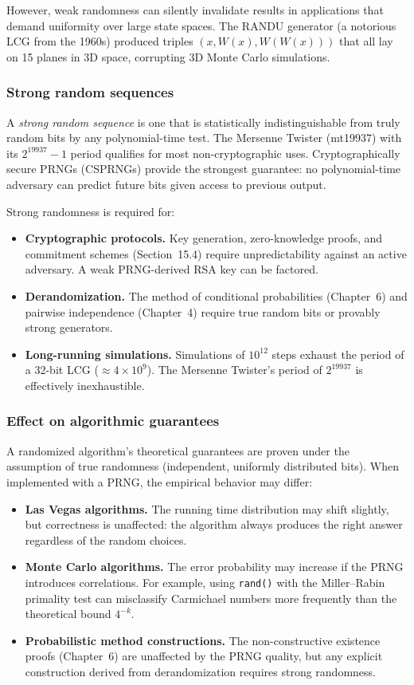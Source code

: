 \documentclass[twoside,12pt]{book}
\theoremstyle{plain}
\theoremstyle{definition}
\theoremstyle{remark}
\begin{document}
However, weak randomness can silently invalidate results in applications
that demand uniformity over large state spaces. The RANDU generator (a
notorious LCG from the 1960s) produced triples $(x, W(x), W(W(x)))$ that
all lay on 15 planes in 3D space, corrupting 3D Monte Carlo simulations.

\subsubsection{Strong random sequences}

A \emph{strong random sequence} is one that is statistically
indistinguishable from truly random bits by any polynomial-time test.
The Mersenne Twister (mt19937) with its $2^{19937}-1$ period qualifies for
most non-cryptographic uses. Cryptographically secure PRNGs (CSPRNGs)
provide the strongest guarantee: no polynomial-time adversary can predict
future bits given access to previous output.

Strong randomness is required for:
\begin{itemize}
\item \textbf{Cryptographic protocols.} Key generation, zero-knowledge
proofs, and commitment schemes (Section~15.4) require unpredictability
against an active adversary. A weak PRNG-derived RSA key can be factored.
\item \textbf{Derandomization.} The method of conditional probabilities
(Chapter~6) and pairwise independence (Chapter~4) require true random
bits or provably strong generators.
\item \textbf{Long-running simulations.} Simulations of $10^{12}$ steps
exhaust the period of a 32-bit LCG ($\approx 4\times 10^9$). The
Mersenne Twister's period of $2^{19937}$ is effectively inexhaustible.
\end{itemize}

\subsubsection{Effect on algorithmic guarantees}

A randomized algorithm's theoretical guarantees are proven under the
assumption of true randomness (independent, uniformly distributed bits).
When implemented with a PRNG, the empirical behavior may differ:

\begin{itemize}
\item \textbf{Las Vegas algorithms.} The running time distribution may
shift slightly, but correctness is unaffected: the algorithm always
produces the right answer regardless of the random choices.
\item \textbf{Monte Carlo algorithms.} The error probability may increase
if the PRNG introduces correlations. For example, using \texttt{rand()}
with the Miller--Rabin primality test can misclassify Carmichael numbers
more frequently than the theoretical bound $4^{-k}$.
\item \textbf{Probabilistic method constructions.} The non-constructive
existence proofs (Chapter~6) are unaffected by the PRNG quality, but any
explicit construction derived from derandomization requires strong
randomness.
\end{itemize}
\end{document}
